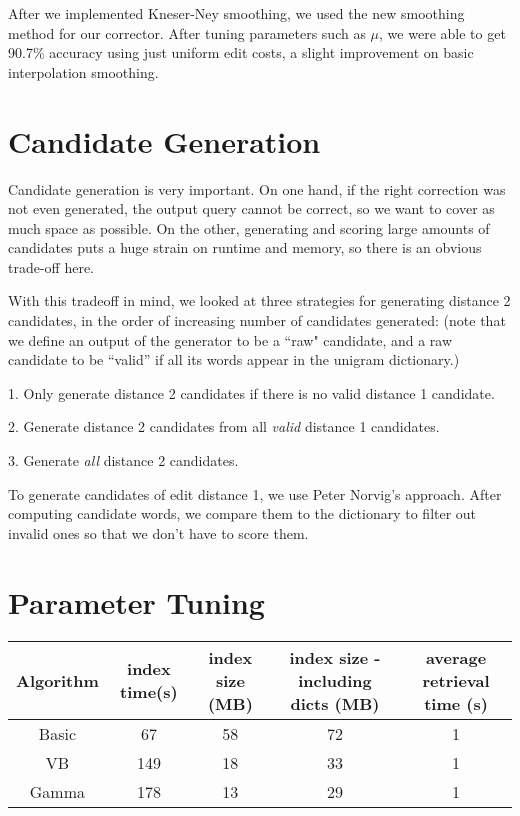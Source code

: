 \documentclass[10pt,twocolumn]{article}
\begin{document}
After we implemented Kneser-Ney smoothing, we used the new smoothing method for our corrector. After tuning parameters such as $\mu$, we were able to get 90.7\% accuracy using just uniform edit costs, a slight improvement on basic interpolation smoothing. 
\section{Candidate Generation}
Candidate generation is very important. On one hand, if the right correction was not even generated, the output query cannot be correct, so we want to cover as much space as possible. On the other, generating and scoring large amounts of candidates puts a huge strain on runtime and memory, so there is an obvious trade-off here.

With this tradeoff in mind, we looked at three strategies for generating distance 2 candidates, in the order of increasing number of candidates generated: (note that we define an output of the generator to be a ``raw" candidate, and a raw candidate to be ``valid'' if all its words appear in the unigram dictionary.)

1. Only generate distance 2 candidates if there is no valid distance 1 candidate.

2. Generate distance 2 candidates from all {\it valid} distance 1 candidates.

3. Generate {\it all} distance 2 candidates.



To generate candidates of edit distance 1, we use Peter Norvig's approach. After computing candidate words, we compare them to the dictionary to filter out invalid ones so that we don't have to score them.


\section{Parameter Tuning}
\begin{table}[ht]
\begin{tabular}{| c | c | c | c | c |}
\hline
Algorithm & index time(s) & index size (MB) & index size - including dicts (MB) & average retrieval time (s)\\\hline
Basic & 67 & 58 & 72 & 1\\\hline
VB & 149 & 18 & 33 & 1\\\hline
Gamma & 178 & 13 & 29 & 1\\\hline
\end{tabular}
\end{table}



\end{document}
